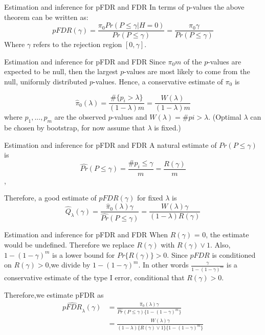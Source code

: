 \documentclass{beamer}
\begin{document}
\begin{frame}[t]{Estimation and inference for pFDR and FDR}\vspace{10pt}
In terms of p-values the above theorem can be written as:
$$pFDR(\gamma) = \frac{\pi_0Pr(P \leq \gamma |H=0)}{Pr(P \leq \gamma)}  = \frac{\pi_0 \gamma}{Pr(P \leq \gamma)}$$
Where $\gamma$ refers to the rejection region $[0,\gamma]$.
	
\end{frame}

\begin{frame}[t]{Estimation and inference for pFDR and FDR}\vspace{10pt}
Since $\pi_0m$ of the $p$-values are expected to be null, then the largest $p$-values are most likely to come from the null, uniformly distributed $p$-values. Hence, a conservative estimate of $\pi_0$ is

$$ \hat\pi_0(\lambda) = \frac{\#\{p_i  > \lambda\}}{(1-\lambda)m} = \frac{W(\lambda)}{(1-\lambda)m}$$	
where $p_1,...,p_m$ are the observed $p$-values and $W(\lambda) =\#{pi > \lambda}$. (Optimal $\lambda$ can be chosen by bootstrap, for now assume that $\lambda$ is fixed.)

\end{frame}


\begin{frame}[t]{Estimation and inference for pFDR and FDR}\vspace{10pt}
A natural estimate of $Pr(P \leq \gamma)$ is
$$ \hat{Pr}(P \leq \gamma) = \frac{\#{p_i \leq \gamma}}{m} = \frac{R(\gamma)}{m} $$,

Therefore, a good estimate of $pFDR(\gamma)$ for fixed $\lambda$ is
$$ \hat{Q}_{\lambda}(\gamma) = \frac{\hat\pi_0(\lambda)\gamma}{\hat{Pr}(P \leq \gamma)} = \frac{W(\lambda)\gamma}{(1-\lambda)R(\gamma)} $$

\end{frame}

\begin{frame}[t]{Estimation and inference for pFDR and FDR}\vspace{10pt}
When $R(\gamma)$ = 0, the estimate would be undefined. Therefore we replace $R(\gamma)$ with $R(\gamma) \vee 1$. Also, $1-(1-\gamma)^m$ is a lower bound for $Pr\{R(\gamma)\}> 0$. Since $pFDR$ is conditioned on $R(\gamma) >0$,we divide by $1-(1-\gamma)^m$. In other words $\frac{\gamma}{1-(1-\gamma)^m}$ is a conservative estimate of the type I error, conditional that $R(\gamma) > 0$.

Therefore,we estimate pFDR as
\begin{align*}
 \hat{pFDR}_{\lambda}(\gamma) &= \frac{\hat\pi_0(\lambda)\gamma}{\hat{Pr}(P \leq \gamma)\{1-(1-\gamma)^m\}} \\
                              &= \frac{W(\lambda)\gamma}{(1-\lambda)\{R(\gamma)\vee 1\}\{1-(1-\gamma)^m\}} 
\end{align*}

\end{frame}
\end{document}
